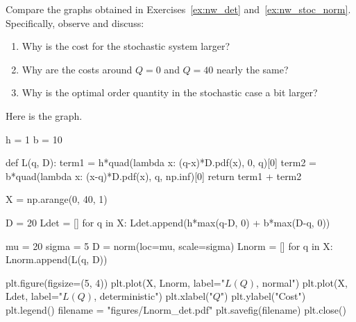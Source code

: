 \begin{exercise}[Continuation]
Compare  the graphs obtained in Exercises~\ref{ex:nw_det} and~\ref{ex:nw_stoc_norm}. 
Specifically, observe and discuss:
\begin{enumerate}
\item Why is the  cost for the stochastic system larger?
\item Why are the costs around $Q=0$ and $Q=40$ nearly the same? 
\item Why is the optimal order quantity in the stochastic case a bit larger?
\end{enumerate}
\begin{solution}
Here is the graph.


\begin{pycode}[news]
h = 1
b = 10

def L(q, D):
    term1 = h*quad(lambda x: (q-x)*D.pdf(x), 0, q)[0]
    term2 = b*quad(lambda x: (x-q)*D.pdf(x), q, np.inf)[0]
    return term1 + term2

X = np.arange(0, 40, 1)

D = 20
Ldet = []
for q in X:
    Ldet.append(h*max(q-D, 0) + b*max(D-q, 0))

mu = 20
sigma = 5 
D = norm(loc=mu, scale=sigma) 
Lnorm = []
for q in X:
    Lnorm.append(L(q, D))

plt.figure(figsize=(5, 4))
plt.plot(X, Lnorm, label="$L(Q)$, normal")
plt.plot(X, Ldet, label="$L(Q)$, deterministic")
plt.xlabel("$Q$")
plt.ylabel("Cost")
plt.legend()
filename = "figures/Lnorm_det.pdf"
plt.savefig(filename)
plt.close()
\end{pycode}


\end{solution}
\end{exercise}
